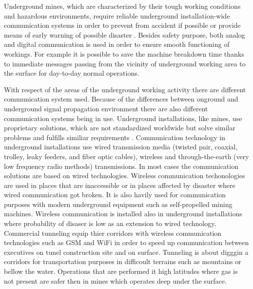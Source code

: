 \documentclass[../main.tex]{subfiles}
\begin{document}
Underground mines, which are characterized by their tough working conditions and hazardous environments, require reliable underground installation-wide communication systems in order to prevent from accident if possible or provide means of early warning of possible disaster \cite{Book_wireless_in_mines}. Besides safety purpose, both analog and digital communication is used in order to ensure smooth functioning of workings. For example it is possible to save the machine breakdown time thanks to immediate messages passing  from the vicinity of underground working area to the surface for day-to-day normal operations.

With respect of the areas of the underground working activity there are different communication system used. Because of the differences between onground and underground signal propagation environment there are also different communication systems being in use. Underground installations, like mines, use proprietary solutions, which are not standardized worldwide but solve similar problems and fulfills similiar requirements \cite{article-wireless-undeground-critics}\cite{article_mine_communications_safety}. Communication technology in underground installations use wired transmission media (twisted pair, coaxial, trolley, leaky feeders, and fiber optic cables), wireless and through-the-earth (very low frequency radio methods) transmissions. In most cases the communication solutions are based on wired technologies. Wireless communication techonologies are used in places that are inaccessible or in places affected by disaster where wired communication got broken. It is also havily used for communication purposes with modern underground equipment such as self-propelled mining machines. Wireless communication is installed also in underground installations where probability of disaser is low as an extension to wired technology. Commercial tunneling equip thier corridors with wireless communication technologies such as GSM and WiFi in order to speed up communication between executives on tunel construction site and on surface. Tunneling is about digggin a corridors for transportation purposes in difficoult terrains such as mountains or bellow the water. Operations that are performed it high latitudes where gas is not present are safer then in mines which operates deep under the surface.
\end{document}
